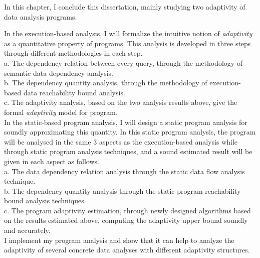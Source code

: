 In this chapter, I conclude this dissertation, mainly studying two adaptivity of data analysis programs.


In the execution-based analysis, I will formalize the intuitive notion of \emph{adaptivity} as a quantitative 
   property of programs. This analysis is developed in three steps through different methodologies in each step. 
   \\
	a. The dependency relation between every query, through the methodology of semantic data dependency analysis.
   \\
	b. The dependency quantity analysis, through the methodology of execution-based data reachability bound analysis.
   \\
	c. The adaptivity analysis, based on the two analysis results above, give the formal \emph{adaptivity} model 
   for program.
   \\   
	In the static-based program analysis, I will design a static program analysis for soundly approximating this quantity.
   In this static program analysis, the program will be analysed in the same 3 aspects as the execution-based analysis 
   while through static program analysis techniques, and a sound estimated result will be given in each aspect as follows.
   \\
	a. The data dependency relation analysis through the static data flow analysis technique.
   \\
	b. The dependency quantity analysis through the static program reachability bound analysis techniques.
   \\
	c. The program adaptivity estimation, through newly designed algorithms based on the results estimated above, 
   computing the adaptivity upper bound soundly 
   and accurately.
   \\
I implement my program analysis and show that it can help to analyze the adaptivity of several concrete data analyses with different adaptivity structures.

